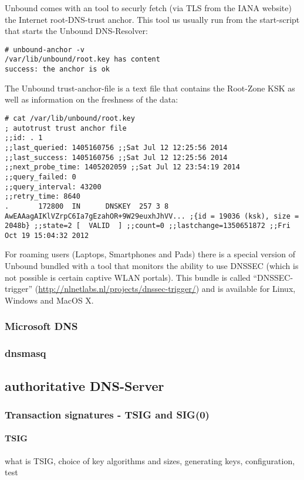 Unbound comes with an tool to securly fetch (via TLS from the IANA
website) the Internet root-DNS-trust anchor. This tool us usually run
from the start-script that starts the Unbound DNS-Resolver:
\begin{lstlisting}
# unbound-anchor -v
/var/lib/unbound/root.key has content
success: the anchor is ok
\end{lstlisting}

The Unbound trust-anchor-file is a text file that contains the
Root-Zone KSK as well as information on the freshness of the data:
\begin{lstlisting}
# cat /var/lib/unbound/root.key
; autotrust trust anchor file
;;id: . 1
;;last_queried: 1405160756 ;;Sat Jul 12 12:25:56 2014
;;last_success: 1405160756 ;;Sat Jul 12 12:25:56 2014
;;next_probe_time: 1405202059 ;;Sat Jul 12 23:54:19 2014
;;query_failed: 0
;;query_interval: 43200
;;retry_time: 8640
.       172800  IN      DNSKEY  257 3 8 AwEAAagAIKlVZrpC6Ia7gEzahOR+9W29euxhJhVV... ;{id = 19036 (ksk), size = 2048b} ;;state=2 [  VALID  ] ;;count=0 ;;lastchange=1350651872 ;;Fri Oct 19 15:04:32 2012
\end{lstlisting}

For roaming users (Laptops, Smartphones and Pads) there is a special
version of Unbound bundled with a tool that monitors the ability to
use DNSSEC (which is not possible is certain captive WLAN
portals). This bundle is called ``DNSSEC-trigger''
(\url{http://nlnetlabs.nl/projects/dnssec-trigger/}) and is available
for Linux, Windows and MacOS X.

\subsubsection{Microsoft DNS}

\subsubsection{dnsmasq}

\subsection{authoritative DNS-Server}

\subsubsection{Transaction signatures - TSIG and SIG(0)}

\paragraph{TSIG}
what is TSIG, choice of key algorithms and sizes, generating keys,
configuration, test

